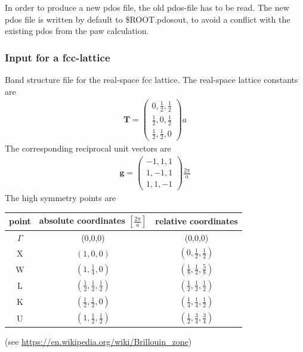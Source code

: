 \documentclass[final,12pt]{article}
\newcommand{\mat}[1]{\mathbf{#1}}
\begin{document}
{{{{{{\noindent
In order to produce a new pdos file, the old pdos-file has to be read.
The new pdos file is written by default to \$ROOT.pdosout, to avoid a 
conflict with the existing pdos from the paw calculation.


\subsubsection{Input for a fcc-lattice}
Band structure file for the real-space fcc lattice. The real-space
lattice constants are
\begin{eqnarray}
\mat{T}=\left(\begin{array}{ccc}
0,\frac{1}{2},\frac{1}{2}\\
\frac{1}{2},0,\frac{1}{2}\\
\frac{1}{2},\frac{1}{2},0\end{array}
\right)a
\end{eqnarray}
The corresponding reciprocal unit vectors are
\begin{eqnarray}
\mat{g}=\left(\begin{array}{ccc}
-1,1,1\\
1,-1,1\\
1,1,-1
\end{array}\right)\frac{2\pi}{a}
\end{eqnarray}
The high symmetry points are 
\begin{center}
\begin{tabular}{|c|c|c|}
\hline
point & absolute coordinates $\left[\frac{2\pi}{a}\right]$
      & relative coordinates\\
\hline
$\Gamma$ & (0,0,0) & (0,0,0)\\
X        & $(1,0,0)$ &$(0,\frac{1}{2},\frac{1}{2})$\\
W        & $(1,\frac{1}{4},0)$ &$(\frac{1}{8},\frac{1}{2},\frac{5}{8})$\\
L        & $(\frac{1}{2},\frac{1}{2},\frac{1}{2})$ 
              & $(\frac{1}{2},\frac{1}{2},\frac{1}{2})$\\
K        & $(\frac{1}{2},\frac{1}{2},0)$ 
              & $(\frac{1}{4},\frac{1}{4},\frac{1}{2})$\\
U        & $(1,\frac{1}{2},\frac{1}{2})$ 
              & $(\frac{1}{2},\frac{3}{4},\frac{3}{4})$\\
\hline
\end{tabular}
\end{center}
(see \url{https://en.wikipedia.org/wiki/Brillouin_zone})

}}}}}}
\end{document}
